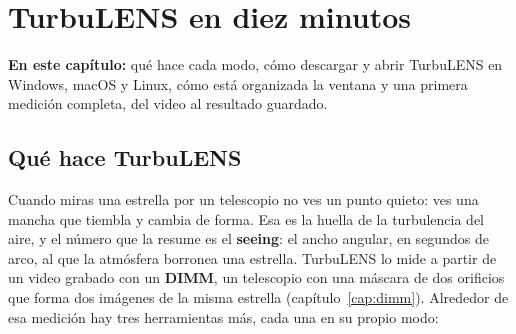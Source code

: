\chapter{TurbuLENS en diez minutos}\label{cap:primeros}

\begin{resumen}
\textbf{En este capítulo:} qué hace cada modo, cómo descargar y abrir TurbuLENS en Windows, macOS y Linux, cómo está
organizada la ventana y una primera medición completa, del video al resultado guardado.
\end{resumen}

\section{Qué hace TurbuLENS}

Cuando miras una estrella por un telescopio no ves un punto quieto: ves una mancha que tiembla y cambia de forma. Esa
es la huella de la turbulencia del aire, y el número que la resume es el \textbf{seeing}: el ancho angular, en segundos
de arco, al que la atmósfera borronea una estrella. TurbuLENS lo mide a partir de un video grabado con un
\textbf{DIMM}, un telescopio con una máscara de dos orificios que forma dos imágenes de la misma estrella
(capítulo~\ref{cap:dimm}). Alrededor de esa medición hay tres herramientas más, cada una en su propio modo:

